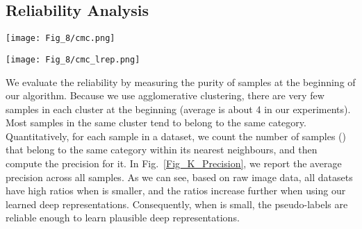 \documentclass[10pt,twocolumn,letterpaper]{article}
\begin{document}
\subsection{Reliability Analysis}
\begin{figure*}[t]
\begin{minipage}{0.49\linewidth}
\centering
\texttt{[image: Fig\_8/cmc.png]}
\end{minipage}
\begin{minipage}{0.49\linewidth}
\centering
\texttt{[image: Fig\_8/cmc\_lrep.png]}
\end{minipage}
\vspace{-3pt}
\caption{Average purity of K-nearest neighbour for varying values of . Left is computed using raw image data, while right is computed using our learned representation.}
\label{Fig_K_Precision}
\end{figure*}
We evaluate the reliability by measuring the purity of samples at the beginning of our algorithm. Because we use agglomerative clustering, there are very few samples in each cluster at the beginning (average is about 4 in our experiments). Most samples in the same cluster tend to belong to the same category. Quantitatively, for each sample in a dataset, we count the number of samples () that belong to the same category within its  nearest neighbours, and then compute the precision  for it. In Fig.~\ref{Fig_K_Precision}, we report the average precision across all samples. As we can see, based on raw image data, all datasets have high ratios when  is smaller, and the ratios increase further when using our learned deep representations. Consequently, when  is small, the pseudo-labels are reliable enough to learn plausible deep representations.
\end{document}
